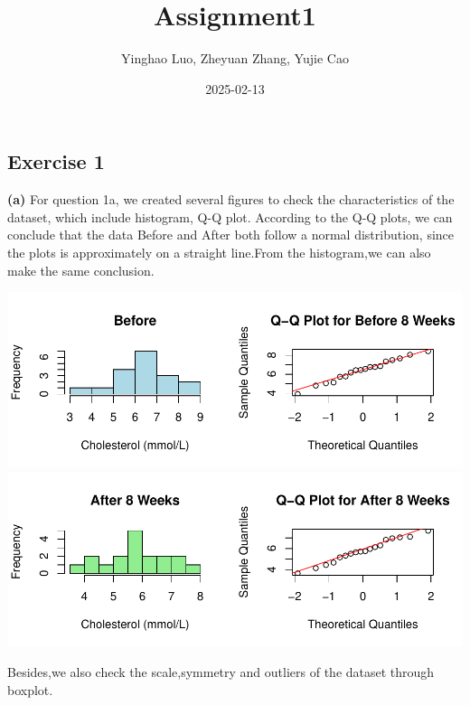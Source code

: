 \documentclass[
]{article}
\title{Assignment1}
\author{Yinghao Luo, Zheyuan Zhang, Yujie Cao}
\date{2025-02-13}
\newenvironment{Shaded}{\begin{snugshade}}{\end{snugshade}}
\newcommand{\AttributeTok}[1]{\textcolor[rgb]{0.13,0.29,0.53}{#1}}
\newcommand{\DecValTok}[1]{\textcolor[rgb]{0.00,0.00,0.81}{#1}}
\newcommand{\FunctionTok}[1]{\textcolor[rgb]{0.13,0.29,0.53}{\textbf{#1}}}
\newcommand{\NormalTok}[1]{#1}
\newcommand{\SpecialCharTok}[1]{\textcolor[rgb]{0.81,0.36,0.00}{\textbf{#1}}}
\begin{document}
\maketitle

\subsection{Exercise 1}\label{exercise-1}

\textbf{(a)} For question 1a, we created several figures to check the
characteristics of the dataset, which include histogram, Q-Q plot.
According to the Q-Q plots, we can conclude that the data Before and
After both follow a normal distribution, since the plots is
approximately on a straight line.From the histogram,we can also make the
same conclusion.

\includegraphics{assignment1-copy_files/figure-latex/unnamed-chunk-1-1.pdf}
\includegraphics{assignment1-copy_files/figure-latex/unnamed-chunk-1-2.pdf}

Besides,we also check the scale,symmetry and outliers of the dataset
through boxplot.

\begin{Shaded}
\end{Shaded}
\end{document}
